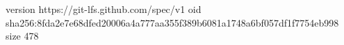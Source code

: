 version https://git-lfs.github.com/spec/v1
oid sha256:8fda2e7e68dfed20006a4a777aa355f389b6081a1748a6bf057df1f7754eb998
size 478
